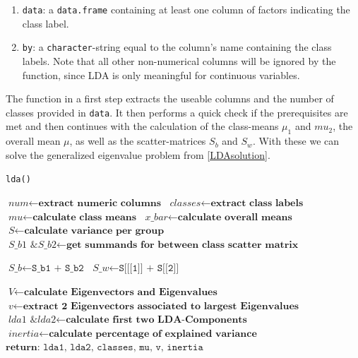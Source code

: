 \documentclass{article}
\begin{document}
\begin{enumerate}
\item \texttt{data}: a \texttt{data.frame} containing at least one column of factors indicating the class label.
\item \texttt{by}: a \texttt{character}-string equal to the column's name containing the class labels. Note that all other non-numerical columns will be ignored by the function, since LDA is only meaningful for continuous variables.
\end{enumerate} 

The function in a first step extracts the useable columns and the number of classes provided in \texttt{data}. It then performs a quick check if the prerequisites are met and then continues with the calculation of the class-means $\mu_1$ and $mu_2$, the overall mean $\mu$, as well as the scatter-matrices $S_b$ and $S_w$. With these we can solve the generalized eigenvalue problem from \ref{LDAsolution}.

\begin{algorithm}
\caption{\texttt{lda()}} \label{lda-function}
\begin{algorithmic}[1]
\State $\textit{num} \gets \textbf{extract numeric columns}$
\State $\textit{classes} \gets \textbf{extract class labels}$
\State $\textit{mu} \gets \textbf{calculate class means}$
\State $\textit{x\_bar} \gets \textbf{calculate overall means}$
\State $\textit{S} \gets \textbf{calculate variance per group}$
\State $\textit{S\_b1 \& S\_b2} \gets \textbf{get summands for between class scatter matrix}$
\EndProcedure

\State $\textit{S\_b} \gets \texttt{S\_b1 + S\_b2}$
\State $\textit{S\_w} \gets \texttt{S[[[1]] + S[[2]]}$
\EndProcedure

\State $\textit{V} \gets \textbf{calculate Eigenvectors and Eigenvalues}$
\State $\textit{v} \gets \textbf{extract 2 Eigenvectors associated to largest Eigenvalues}$
\State $\textit{lda1 \& lda2} \gets \textbf{calculate first two LDA-Components}$
\State $\textit{inertia} \gets \textbf{calculate percentage of explained variance}$
\State $\textbf{return: } \texttt{lda1, lda2, classes, mu, v, inertia}$
\EndProcedure

\end{algorithmic}
\end{algorithm}
\end{document}
